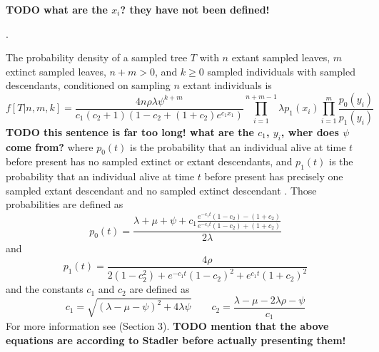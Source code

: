 \documentclass{llncs}
\begin{document}
{\bf TODO what are the $x_i$? they have not been defined!} 

\citep[pg.~11][]{Stadler2010}.

The probability density of a sampled tree $T$ with $n$ extant sampled leaves,
$m$ extinct sampled leaves, $n+m > 0$, and $k \geq 0$ sampled individuals with
sampled descendants, conditioned on sampling $n$ extant individuals is
%
%
$$f[T|n,m,k] = \frac{4n\rho\lambda\psi^{k+m}}{c_1(c_2+1)(1-c_2+(1+c_2)e^{c_1x_1})}\prod_{i=1}^{n+m-1}\lambda p_1(x_i)\prod_{i=1}^{m}\frac{p_0(y_i)}{p_1(y_i)}$$
%
%
{\bf TODO this sentence is far too long! what are the $c_1$, $y_i$, wher does $\psi$ come from?} where $p_0(t)$ is the probability that an individual alive at time $t$ before
present has no sampled extinct or extant descendants, and $p_1(t)$ is the
probability that an individual alive at time $t$ before present has precisely
one sampled extant descendant and no sampled extinct descendant \citep[Eqn (9)][]{Stadler2010}. Those probabilities
are defined as
%
$$p_0(t) = \frac{\lambda+\mu+\psi+c_1\frac{e^{-c_1 t}(1-c_2)-(1+c_2)}{e^{-c_1t}(1-c_2)+(1+c_2)}}{2\lambda}$$
and
$$p_1(t) = \frac{4\rho}{2(1-c_2^2)+e^{-c_1t}(1-c_2)^2+e^{c_1t}(1+c_2)^2}$$
%
and the constants $c_1$ and $c_2$ are defined as
%
$$c_1 = \sqrt{(\lambda-\mu-\psi)^2 + 4\lambda\psi} \qquad c_2 = \frac{\lambda-\mu-2\lambda\rho-\psi}{c_1}$$
%
For more information see \citep{Stadler2010} (Section 3).
{\bf TODO mention that the above equations are according to Stadler before actually presenting them!} 
\end{document}
